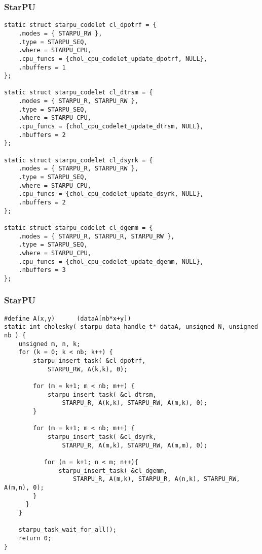 \begin{frame}
  \frametitle{StarPU}
  \vspace{-4mm}
  \begin{block}{}
\begin{lstlisting}[basicstyle=\scriptsize\ttfamily]
static struct starpu_codelet cl_dpotrf = {
    .modes = { STARPU_RW },
    .type = STARPU_SEQ,
    .where = STARPU_CPU,
    .cpu_funcs = {chol_cpu_codelet_update_dpotrf, NULL},
    .nbuffers = 1
};

static struct starpu_codelet cl_dtrsm = {
    .modes = { STARPU_R, STARPU_RW },
    .type = STARPU_SEQ,
    .where = STARPU_CPU,
    .cpu_funcs = {chol_cpu_codelet_update_dtrsm, NULL},
    .nbuffers = 2
};

static struct starpu_codelet cl_dsyrk = {
    .modes = { STARPU_R, STARPU_RW },
    .type = STARPU_SEQ,
    .where = STARPU_CPU,
    .cpu_funcs = {chol_cpu_codelet_update_dsyrk, NULL},
    .nbuffers = 2
};

static struct starpu_codelet cl_dgemm = {
    .modes = { STARPU_R, STARPU_R, STARPU_RW },
    .type = STARPU_SEQ,
    .where = STARPU_CPU,
    .cpu_funcs = {chol_cpu_codelet_update_dgemm, NULL},
    .nbuffers = 3
};
\end{lstlisting}
  \end{block}
\end{frame}
\begin{frame}
  \frametitle{StarPU}
  \vspace{-4mm}
  \begin{block}{}
\begin{lstlisting}[basicstyle=\scriptsize\ttfamily]
#define A(x,y)	    (dataA[nb*x+y])
static int cholesky( starpu_data_handle_t* dataA, unsigned N, unsigned nb ) {
    unsigned m, n, k;
    for (k = 0; k < nb; k++) {
        starpu_insert_task( &cl_dpotrf,
            STARPU_RW, A(k,k), 0);

        for (m = k+1; m < nb; m++) {
            starpu_insert_task( &cl_dtrsm,
                STARPU_R, A(k,k), STARPU_RW, A(m,k), 0);
        }

        for (m = k+1; m < nb; m++) {
            starpu_insert_task( &cl_dsyrk,
                STARPU_R, A(m,k), STARPU_RW, A(m,m), 0);

           for (n = k+1; n < m; n++){
               starpu_insert_task( &cl_dgemm,
                   STARPU_R, A(m,k), STARPU_R, A(n,k), STARPU_RW, A(m,n), 0);
	    }
      }
    }

    starpu_task_wait_for_all();
    return 0;
}
\end{lstlisting}
  \end{block}
\end{frame}
